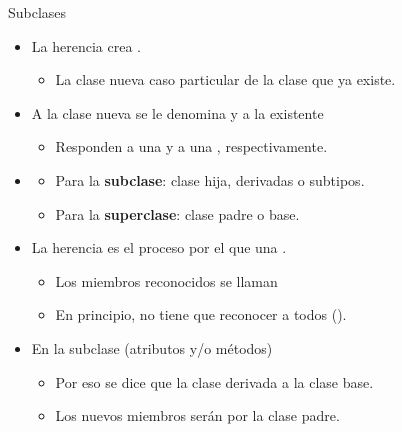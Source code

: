 \documentclass[10pt,envcountsect,spanish]{beamer}
\begin{document}
\begin{frame}{Subclases} 

\begin{itemize}
\item La herencia crea .
\begin{itemize}
\item La clase nueva  caso particular de la clase que ya existe.
\end{itemize}

\item A la clase nueva se le denomina   y a la existente  
\begin{itemize}
\item Responden a una  y a una , respectivamente.
\end{itemize}
	
\item {}
\begin{itemize}
\item Para la \textbf{subclase}: clase hija, derivadas o subtipos. 
\item Para la \textbf{superclase}: clase padre o base.
\end{itemize}

\item La herencia es el proceso por el que una .
\begin{itemize}
\item Los miembros reconocidos se llaman 
\item En principio, no tiene que reconocer a todos ().
\end{itemize}

\item En la subclase  (atributos y/o  métodos)
\begin{itemize}
\item Por eso se dice que la clase derivada  a la clase base.
\item Los nuevos miembros  serán  por la clase padre.
\end{itemize}

\end{itemize}
\end{frame}
\end{document}
